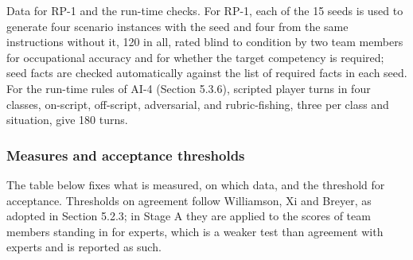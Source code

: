 Data for RP-1 and the run-time checks. For RP-1, each of the 15 seeds is used to generate four scenario instances with the seed and four from the same instructions without it, 120 in all, rated blind to condition by two team members for occupational accuracy and for whether the target competency is required; seed facts are checked automatically against the list of required facts in each seed. For the run-time rules of AI-4 (Section 5.3.6), scripted player turns in four classes, on-script, off-script, adversarial, and rubric-\allowbreak{}fishing, three per class and situation, give 180 turns.

\subsubsection{Measures and acceptance thresholds}

The table below fixes what is measured, on which data, and the threshold for acceptance. Thresholds on agreement follow Williamson, Xi and Breyer\cite{r71}, as adopted in Section 5.2.3; in Stage A they are applied to the scores of team members standing in for experts, which is a weaker test than agreement with experts and is reported as such.

